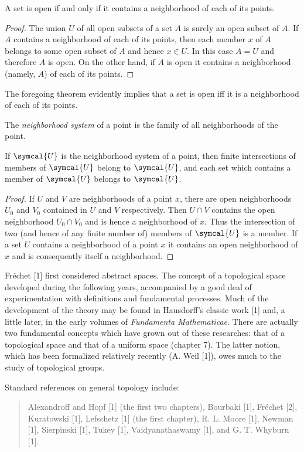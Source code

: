 \begin{theorem}
    A set is open if and only if it contains a neighborhood of each of its points.
    \begin{proof}
        The union \(U\) of all open subsets of a set \(A\) is surely an open subset of \(A\). If \(A\) contains a neighborhood of each of its points, then each member \(x\) of \(A\) belongs to some open subset of \(A\) and hence \(x\in U\). In this case \(A=U\) and therefore \(A\) is open. On the other hand, if \(A\) is open it contains a neighborhood (namely, \(A\)) of each of its points.
    \end{proof}
\end{theorem}

The foregoing theorem evidently implies that a set is open iff it is a neighborhood of each of its points.

The \emph{neighborhood system} of a point is the family of all neighborhoods of the point.

\begin{theorem}
    If \(\symcal{U}\) is the neighborhood system of a point, then finite intersections of members of \(\symcal{U}\) belong to \(\symcal{U}\), and each set which contains a member of \(\symcal{U}\) belongs to \(\symcal{U}\).
    \begin{proof}
        If \(U\) and \(V\) are neighborhoods of a point \(x\), there are open neighborhoods \(U_0\) and \(V_0\) contained in \(U\) and \(V\) respectively. Then \(U\cap V\) contains the open neighborhood \(U_0\cap V_0\) and is hence a neighborhood of \(x\). Thus the intersection of two (and hence of any finite number of) members of \(\symcal{U}\) is a member. If a set \(U\) contains a neighborhood of a point \(x\) it contains an open neighborhood of \(x\) and is consequently itself a neighborhood.
    \end{proof}
\end{theorem}

\begin{notes}
    Fréchet [1] first considered abstract spaces. The concept of a topological space developed during the following years, accompanied by a good deal of experimentation with definitions and fundamental processes. Much of the development of the theory may be found in Hausdorff's classic work [1] and, a little later, in the early volumes of \emph{Fundamenta Mathematicae}. There are actually two fundamental concepts which have grown out of these researches: that of a topological space and that of a uniform space (chapter 7). The latter notion, which has been formalized relatively recently (A. Weil [1]), owes much to the study of topological groups.
    
    Standard references on general topology include:
    \begin{quote}
        Alexandroff and Hopf [1] (the first two chapters), Bourbaki [1], Fréchet [2], Kuratowski [1], Lefschetz [1] (the first chapter), R. L. Moore [1], Newman [1], Sierpinski [1], Tukey [1], Vaidyanathaswamy [1], and G. T. Whyburn [1].
    \end{quote}
\end{notes}

